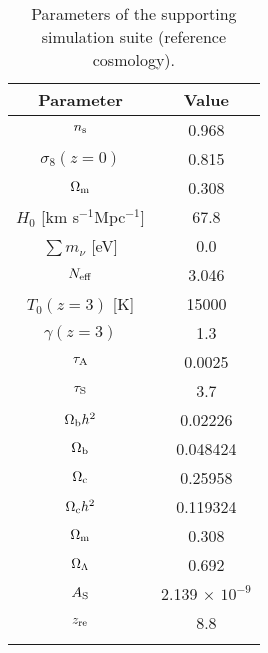 \documentclass{emulateapj}
\begin{document}
\begin{table}
\centering
\caption{Parameters of the supporting simulation suite (reference cosmology).}
\renewcommand\arraystretch{1.5}
\begin{tabular}{cc} 
\hline \hline  
Parameter &  Value \\
\hline
$n_{\rm s}$  &                  0.968  \\
$\sigma_8 (z=0)$          &                   0.815  \\
$\Omega_{\rm m}$ &                 0.308 \\
$H_0$ [km s$^{-1}$Mpc$^{-1}$]              &                        67.8\\
$\sum m_{\nu}$ [eV]              &                        0.0\\
$N_{\rm eff}$              &        3.046\\
\hline
$T_0 (z=3)$ [K] &             15000    \\
$\gamma(z=3)$   &             1.3    \\
$\tau_{\rm A}$   &             0.0025    \\
 $\tau_{\rm S}$   &             3.7   \\
\hline
$\Omega_{\rm b} h^2$  &               0.02226   \\
$\Omega_{\rm b}$ &               0.048424   \\
$\Omega_{\rm c}$ &               0.25958   \\
$\Omega_{\rm c} h^2$ &               0.119324  \\
$\Omega_{\rm m}$   &             0.308    \\
$\Omega_{\rm \Lambda}$   &             0.692    \\
$A_{\rm S}$   &             2.139  $\times$ $10^{-9}$  \\  
$z_{\rm re}$   &             8.8   \\  
\hline
\hline
\label{table_param_sims}
\end{tabular}
\end{table}
 
 
\end{document}
